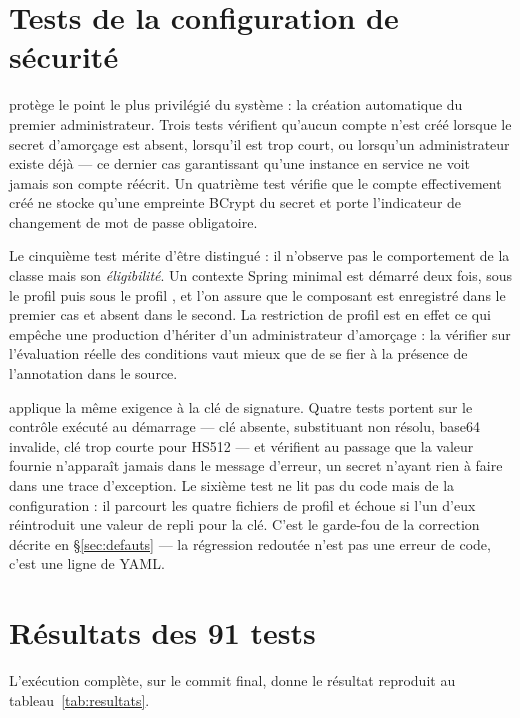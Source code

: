 \section{Tests de la configuration de sécurité}

 protège le point le plus privilégié du système : la
création automatique du premier administrateur. Trois tests vérifient qu'aucun compte
n'est créé lorsque le secret d'amorçage est absent, lorsqu'il est trop court, ou lorsqu'un
administrateur existe déjà --- ce dernier cas garantissant qu'une instance en service ne
voit jamais son compte réécrit. Un quatrième test vérifie que le compte effectivement
créé ne stocke qu'une empreinte BCrypt du secret et porte l'indicateur de changement de
mot de passe obligatoire.

Le cinquième test mérite d'être distingué : il n'observe pas le comportement de la classe
mais son \emph{éligibilité}. Un contexte Spring minimal est démarré deux fois, sous le
profil  puis sous le profil , et l'on assure que le composant est
enregistré dans le premier cas et absent dans le second. La restriction de profil est en
effet ce qui empêche une production d'hériter d'un administrateur d'amorçage : la vérifier
sur l'évaluation réelle des conditions vaut mieux que de se fier à la présence de
l'annotation dans le source.

 applique la même exigence à la clé de signature. Quatre tests
portent sur le contrôle exécuté au démarrage --- clé absente, substituant non résolu,
base64 invalide, clé trop courte pour HS512 --- et vérifient au passage que la valeur
fournie n'apparaît jamais dans le message d'erreur, un secret n'ayant rien à faire dans
une trace d'exception. Le sixième test ne lit pas du code mais de la configuration : il
parcourt les quatre fichiers de profil et échoue si l'un d'eux réintroduit une valeur de
repli pour la clé. C'est le garde-fou de la correction décrite en §\ref{sec:defauts} ---
la régression redoutée n'est pas une erreur de code, c'est une ligne de YAML.

\section{Résultats des 91 tests}

L'exécution complète, sur le commit final, donne le résultat reproduit
au tableau~\ref{tab:resultats}.

